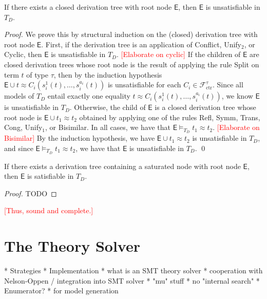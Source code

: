 \documentclass[a4paper,oribibl,envcountsame,draft]{llncs}
\newcommand{\Ec}{\mathsf{E}}
\newcommand{\rn}[1]{\textsf{\small #1}}
\newcommand{\teq}{\approx}
\newcommand{\rem}[1]{\textcolor{red}{[#1]}}
\newcommand{\thD}{T_{D}}
\newcommand\Funcs{\mathcal{F}}
\newcommand\Ctr{\Funcs_{\mathrm{ctr}}}
\begin{document}
\begin{lemma}
If there exists a closed derivation tree with root node $\Ec$, then $\Ec$ is unsatisfiable in $\thD$.
\end{lemma}
\begin{proof}
We prove this by structural induction on the (closed) derivation tree with root node $\Ec$.
First, if the derivation tree is an application of \rn{Conflict}, \rn{Unify$_2$}, or \rn{Cyclic},
then $\Ec$ is unsatisfiable in $\thD$.
\rem{Elaborate on cyclic}
If the children of $\Ec$ are closed derivation trees 
whose root node is the result of applying the rule \rn{Split} on term $t$ of type $\tau$,
then by the induction hypothesis $\Ec \cup t \teq C_i( s^1_i( t ), \ldots, s^{a_i}_i( t ) )$ is unsatisfiable
for each $C_i \in \Ctr^\tau$.
Since all models of $\thD$ entail exactly one equality $t \teq C_i( s^1_i( t ), \ldots, s^{a_i}_i( t ) )$,
we know $\Ec$ is unsatisfiable in $\thD$.
Otherwise, the child of $\Ec$ is a closed derivation tree 
whose root node is $\Ec \cup t_1 \teq t_2$ obtained by applying one of the rules \rn{Refl}, \rn{Symm}, \rn{Trans}, \rn{Cong}, \rn{Unify$_1$}, or \rn{Bisimilar}.
In all cases, we have that $\Ec \models_{\thD} t_1 \teq t_2$.
\rem{Elaborate on Bisimilar}
By the induction hypothesis, we have $\Ec \cup t_1 \teq t_2$ is unsatisfiable in $\thD$, 
and since $\Ec \models_{\thD} t_1 \teq t_2$,
we have that $\Ec$ is unsatisfiable in $\thD$.
\qed
\end{proof}

\begin{lemma}
If there exists a derivation tree containing a saturated node with root node $\Ec$, then $\Ec$ is satisfiable in $\thD$.
\end{lemma}
\begin{proof}
TODO
\end{proof}

\rem{Thus, sound and complete.}
  
\section{The Theory Solver}
\label{sec:the-theory-solver}

  * Strategies
  * Implementation
    * what is an SMT theory solver
    * cooperation with Nelson-Oppen / integration into SMT solver
    * "mu" stuff
    * no "internal search"
  * Enumerator?
    * for model generation

\end{document}
